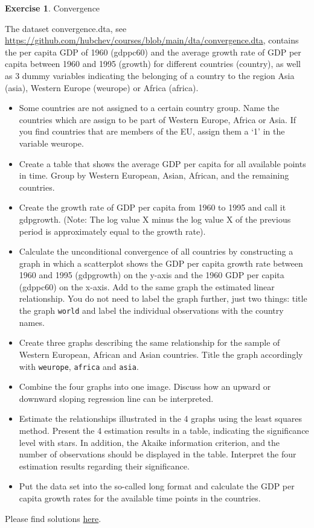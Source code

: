 \documentclass[
  12pt,
  oneside]{book}
\providecommand{\tightlist}{%
  \setlength{\itemsep}{0pt}\setlength{\parskip}{0pt}}
\theoremstyle{definition}
\theoremstyle{definition}
\theoremstyle{definition}
\newtheorem{exercise}{Exercise}[chapter]
\theoremstyle{definition}
\theoremstyle{remark}
\begin{document}
\begin{exercise}
\protect\hypertarget{exr:execonvergence}{}\label{exr:execonvergence}Convergence

The dataset convergence.dta, see \url{https://github.com/hubchev/courses/blob/main/dta/convergence.dta}, contains the per capita GDP of 1960 (gdppc60) and the average growth rate of GDP per capita between 1960 and 1995 (growth) for different countries (country), as well as 3 dummy variables indicating the belonging of a country to the region Asia (asia), Western Europe (weurope) or Africa (africa).

\begin{itemize}
\tightlist
\item
  Some countries are not assigned to a certain country group. Name the countries which are assign to be part of Western Europe, Africa or Asia. If you find countries that are members of the EU, assign them a `1' in the variable weurope.
\item
  Create a table that shows the average GDP per capita for all available points in time. Group by Western European, Asian, African, and the remaining countries.
\item
  Create the growth rate of GDP per capita from 1960 to 1995 and call it gdpgrowth. (Note: The log value X minus the log value X of the previous period is approximately equal to the growth rate).
\item
  Calculate the unconditional convergence of all countries by constructing a graph in which a scatterplot shows the GDP per capita growth rate between 1960 and 1995 (gdpgrowth) on the y-axis and the 1960 GDP per capita (gdppc60) on the x-axis. Add to the same graph the estimated linear relationship. You do not need to label the graph further, just two things: title the graph \texttt{world} and label the individual observations with the country names.
\item
  Create three graphs describing the same relationship for the sample of Western European, African and Asian countries. Title the graph accordingly with \texttt{weurope}, \texttt{africa} and \texttt{asia}.
\item
  Combine the four graphs into one image. Discuss how an upward or downward sloping regression line can be interpreted.
\item
  Estimate the relationships illustrated in the 4 graphs using the least squares method. Present the 4 estimation results in a table, indicating the significance level with stars. In addition, the Akaike information criterion, and the number of observations should be displayed in the table. Interpret the four estimation results regarding their significance.
\item
  Put the data set into the so-called long format and calculate the GDP per capita growth rates for the available time points in the countries.
\end{itemize}

Please find solutions \href{https://raw.githubusercontent.com/hubchev/courses/main/scr/convergence.R}{here}.
\end{exercise}
\end{document}
